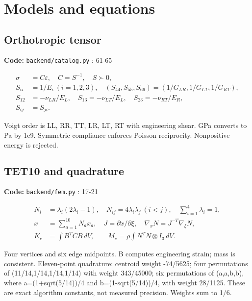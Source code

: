 \documentclass[10pt,a4paper]{article}
\newcommand{\loc}[1]{{\small\color{ink}\textbf{Code:} #1\par}}
\begin{document}
\section{Models and equations}
\begin{samepage}\subsection{Orthotropic tensor}
\loc{\texttt{backend/catalog.py} : 61-65}
\begin{align}\sigma&=C\varepsilon,\quad C=S^{-1},\quad S\succ0,\\
S_{ii}&=1/E_i\ (i=1,2,3),\quad (S_{44},S_{55},S_{66})=(1/G_{LR},1/G_{LT},1/G_{RT}),\\
S_{12}&=-\nu_{LR}/E_L,\quad S_{13}=-\nu_{LT}/E_L,\quad S_{23}=-\nu_{RT}/E_R,\\
S_{ij}&=S_{ji}.\end{align}

Voigt order is LL, RR, TT, LR, LT, RT with engineering shear. GPa converts to Pa by 1e9. Symmetric compliance enforces Poisson reciprocity. Nonpositive energy is rejected.\par
\end{samepage}
\begin{samepage}\subsection{TET10 and quadrature}
\loc{\texttt{backend/fem.py} : 17-21}
\begin{align}N_i&=\lambda_i(2\lambda_i-1),\quad N_{ij}=4\lambda_i\lambda_j\ (i<j),\quad\sum_{i=1}^4\lambda_i=1,\\
x&=\sum_{a=1}^{10}N_ax_a,\quad J=\partial x/\partial\xi,\quad\nabla_xN=J^{-T}\nabla_\xi N,\\
K_e&=\int B^TCB\,dV,\qquad M_e=\rho\int N^TN\otimes I_3\,dV.\end{align}

Four vertices and six edge midpoints. B computes engineering strain; mass is consistent. Eleven-point quadrature: centroid weight -74/5625; four permutations of (11/14,1/14,1/14,1/14) with weight 343/45000; six permutations of (a,a,b,b), where a=(1+sqrt(5/14))/4 and b=(1-sqrt(5/14))/4, with weight 28/1125. These are exact algorithm constants, not measured precision. Weights sum to 1/6.\par
\end{samepage}
\end{document}
